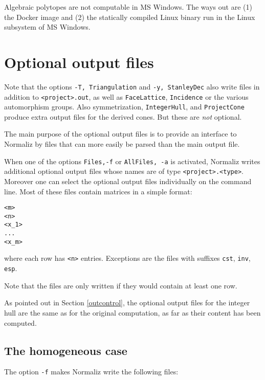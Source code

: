 \documentclass[12pt,a4paper]{scrartcl}
\theoremstyle{definition}
\def\ttt{\texttt}
\begin{document}
Algebraic polytopes are not computable in MS Windows. The ways out are (1) the Docker image and (2) the statically compiled Linux binary run in the Linux subsystem of MS Windows.



\section{Optional output files}\label{optionaloutput}

Note that the options \verb|-T, Triangulation| and \verb|-y, StanleyDec|  also write files in addition to \verb|<project>.out|, as well as \verb|FaceLattice|, \verb|Incidence| or the various automorphism groups. Also symmetrization, \verb|IntegerHull|, and \verb|ProjectCone| produce extra output files for the derived cones. But these are \emph{not} optional.

The main purpose of the optional output files is to provide an interface to Normaliz by files that can more easily be parsed than the main output file.

When one of the options \ttt{Files,-f} or \ttt{AllFiles, -a} is activated, Normaliz
writes additional optional output files whose names are of type
\ttt{<project>.<type>}. Moreover one can select the optional output files individually on the command line. Most of these files contain matrices in a simple format:
\begin{Verbatim}
<m>
<n>
<x_1>
...
<x_m>
\end{Verbatim}
where each row has \verb|<n>| entries. Exceptions are the files with suffixes \verb|cst|, \verb|inv|, \verb|esp|.

Note that the files are only written if they would contain at least one row.

As pointed out in Section \ref{outcontrol}, the optional output files for the integer hull are the same as for the original computation, as far as their content has been computed.

\subsection{The homogeneous case}

The option \ttt{-f} makes Normaliz write the following files:
\end{document}
